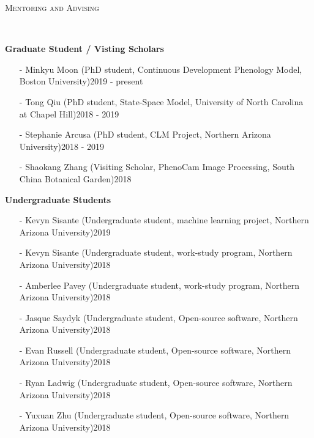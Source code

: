 \documentclass[10pt]{article}
\newenvironment{changemargin}[2]{%
  \begin{list}{}{%
 \setlength{\topsep}{0pt}%
 \setlength{\leftmargin}{#1}%
 \setlength{\rightmargin}{#2}%
 \setlength{\listparindent}{\parindent}%
 \setlength{\itemindent}{\parindent}%
 \setlength{\parsep}{\parskip}%
  }%
  \item[]}{\end{list}
}
\newcommand{\lineover}{
  \begin{changemargin}{-0.05in}{-0.05in}
  \vspace*{-8pt}
  \hrulefill \\
  \vspace*{-2pt}
  \end{changemargin}
}
\newcommand{\header}[1]{
  \begin{changemargin}{-0.5in}{-0.5in}
  \scshape{#1}\\
  \lineover
  \end{changemargin}
}
\newenvironment{body} {
  \vspace*{-2pt}
  \begin{changemargin}{-0.5in}{-0.5in}
}
{\end{changemargin}
}
\begin{document}
\header{Mentoring and Advising}
\begin{body}


  \textbf{Graduate Student / Visting Scholars}\\
  \vspace*{-4pt}
  \begin{itemize} \itemsep -0pt
    \item[-]  Minkyu Moon (PhD student, Continuous Development Phenology Model, Boston University)\hfill {2019 - present}\\
    \item[-]  Tong Qiu (PhD student, State-Space Model, University of North Carolina at Chapel Hill)\hfill {2018 - 2019}\\
    \item[-]  Stephanie Arcusa (PhD student, CLM Project, Northern Arizona University)\hfill {2018 - 2019}\\
    \item[-]  Shaokang Zhang (Visiting Scholar, PhenoCam Image Processing, South China Botanical Garden)\hfill {2018}\\
  \end{itemize}

  \medskip
  \textbf{Undergraduate Students}\\
  \vspace*{-4pt}
  \begin{itemize} \itemsep -0pt
    \item[-]  Kevyn Sisante (Undergraduate student, machine learning project, Northern Arizona University)\hfill {2019}\\
    \item[-]  Kevyn Sisante (Undergraduate student, work-study program, Northern Arizona University)\hfill {2018}\\
    \item[-]  Amberlee Pavey (Undergraduate student, work-study program, Northern Arizona University)\hfill {2018}\\
    \item[-]  Jasque Saydyk (Undergraduate student, Open-source software, Northern Arizona University)\hfill {2018}\\
    \item[-]  Evan Russell (Undergraduate student, Open-source software, Northern Arizona University)\hfill {2018}\\
    \item[-]  Ryan Ladwig (Undergraduate student, Open-source software, Northern Arizona University)\hfill {2018}\\
    \item[-]  Yuxuan Zhu (Undergraduate student, Open-source software, Northern Arizona University)\hfill {2018}\\
  \end{itemize}

  \medskip

\end{body}
\medskip
\end{document}
